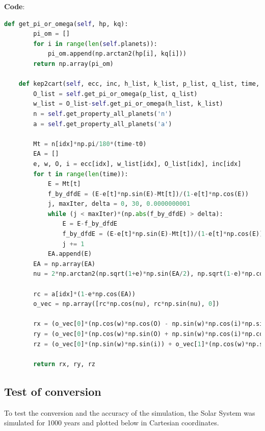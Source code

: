 \documentclass[11pt, oneside]{article}   	%
\begin{document}
\textbf{Code}:
\begin{lstlisting}[language=Python, caption={Converting from Keplerian to Cartesian coordinates}]
    def get_pi_or_omega(self, hp, kq):
        pi_om = []
        for i in range(len(self.planets)):
            pi_om.append(np.arctan2(hp[i], kq[i]))
        return np.array(pi_om)

    def kep2cart(self, ecc, inc, h_list, k_list, p_list, q_list, time, t0, idx):
        O_list = self.get_pi_or_omega(p_list, q_list)
        w_list = O_list-self.get_pi_or_omega(h_list, k_list)
        n = self.get_property_all_planets('n')
        a = self.get_property_all_planets('a')

        Mt = n[idx]*np.pi/180*(time-t0)
        EA = []
        e, w, O, i = ecc[idx], w_list[idx], O_list[idx], inc[idx]
        for t in range(len(time)):
            E = Mt[t]
            f_by_dfdE = (E-e[t]*np.sin(E)-Mt[t])/(1-e[t]*np.cos(E))
            j, maxIter, delta = 0, 30, 0.0000000001
            while (j < maxIter)*(np.abs(f_by_dfdE) > delta):
                E = E-f_by_dfdE
                f_by_dfdE = (E-e[t]*np.sin(E)-Mt[t])/(1-e[t]*np.cos(E))
                j += 1
            EA.append(E)
        EA = np.array(EA)
        nu = 2*np.arctan2(np.sqrt(1+e)*np.sin(EA/2), np.sqrt(1-e)*np.cos(EA/2))

        rc = a[idx]*(1-e*np.cos(EA))
        o_vec = np.array([rc*np.cos(nu), rc*np.sin(nu), 0])

        rx = (o_vec[0]*(np.cos(w)*np.cos(O) - np.sin(w)*np.cos(i)*np.sin(O)) - o_vec[1]*(np.sin(w)*np.cos(O) + np.cos(w)*np.cos(i)*np.sin(O)))
        ry = (o_vec[0]*(np.cos(w)*np.sin(O) + np.sin(w)*np.cos(i)*np.cos(O)) + o_vec[1]*(np.cos(w)*np.cos(i)*np.cos(O) - np.sin(w)*np.sin(O)))
        rz = (o_vec[0]*(np.sin(w)*np.sin(i)) + o_vec[1]*(np.cos(w)*np.sin(i)))

        return rx, ry, rz
\end{lstlisting}

\subsection{Test of conversion}

To test the conversion and the accuracy of the simulation, the Solar System was simulated for 1000 years and plotted below in Cartesian coordinates.
\end{document}
